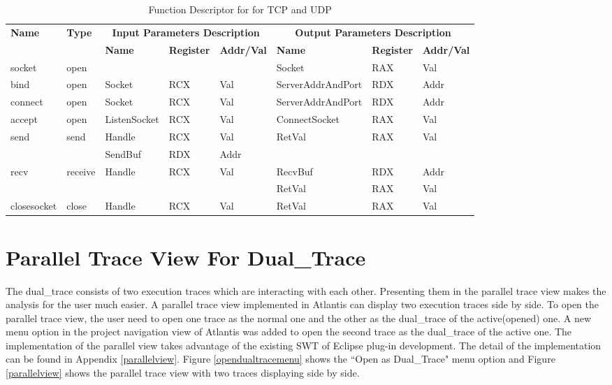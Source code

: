 \begin{table}[H]
  \centering
  \caption{Function Descriptor for for TCP and UDP}
  \label{tcpupdfunctions}
\begin{tabular}{|l|l|l|l|l|l|l|l|}
\hline
             \multirow{2}{*}{{\textbf{Name}}} & \multirow{2}{*}{{\textbf{Type}}} & \multicolumn{3}{c|}{\textbf{Input Parameters Description}} & \multicolumn{3}{c|}{\textbf{Output Parameters Description}} \\
              \cline{3-8} 
             & & \textbf{Name}& \textbf{Register} & \textbf{Addr/Val} & \textbf{Name}& \textbf{Register} &  \textbf{Addr/Val}  \\
             \hline
      socket
       &open &  &   &  &  Socket & RAX & Val\\ 
      \hline
      bind
       &open & Socket &  RCX & Val &  ServerAddrAndPort & RDX & Addr\\
      \hline   
            connect
       &open & Socket &  RCX & Val &  ServerAddrAndPort & RDX & Addr\\
      \hline   
     accept
       &open &  ListenSocket & RCX & Val & ConnectSocket & RAX & Val\\
      \hline                    
      \multirow{2}{*}{send}
       &\multirow{2}{*}{send} &  Handle & RCX & Val & \multirow{2}{*}{RetVal}& \multirow{2}{*}{RAX} & \multirow{2}{*}{Val} \\
       \cline{3-5}
      & & SendBuf& RDX&Addr &  &  & \\
      \hline            
      \multirow{2}{*}{recv}
       &\multirow{2}{*}{receive}&  \multirow{2}{*}{Handle} & \multirow{2}{*}{RCX} & \multirow{2}{*}{Val}& RecvBuf& RDX&Addr\\
       \cline{6-8}
      & &  &   &  &  RetVal & RAX & Val\\ 
      \hline      
      closesocket &
       close &  Handle & RCX & Val & RetVal & RAX & Val\\
      \hline                          
  \end{tabular}    
\end{table}

\section{Parallel Trace View For Dual\_Trace}
The dual\_trace consists of two execution traces which are interacting with each other. Presenting them in the parallel trace view makes the analysis for the user much easier. A parallel trace view implemented in Atlantis can display two execution traces side by side. To open the parallel trace view, the user need to open one trace as the normal one and the other as the dual\_trace of the active(opened) one. A new menu option in the project navigation view of Atlantis was added to open the second trace as the dual\_trace of the active one. The implementation of the parallel view takes advantage of the existing SWT of Eclipse plug-in development. The detail of the implementation can be found in Appendix \ref{parallelview}. Figure \ref{opendualtracemenu} shows the ``Open as Dual\_Trace" menu option and Figure \ref{parallelview} shows the parallel trace view with two traces displaying side by side.

